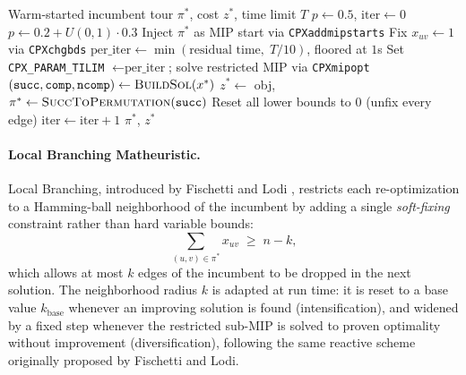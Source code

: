 \documentclass{article}
\begin{document}
\begin{algorithm}[H]
\caption{Hard Fixing Matheuristic (\texttt{TSPopt\_hard\_fixing})}
\label{alg:hardfixing}
\begin{algorithmic}[1]
\Require Warm-started incumbent tour $\pi^*$, cost $z^*$, time limit $T$
\State $p \leftarrow 0.5$, $\text{iter} \leftarrow 0$
        \State $p \leftarrow 0.2 + U(0,1) \cdot 0.3$
    \EndIf
    \State Inject $\pi^*$ as MIP start via \texttt{CPXaddmipstarts}
            \State Fix $x_{uv} \leftarrow 1$ via \texttt{CPXchgbds}
        \EndIf
    \EndFor
    \State $\text{per\_iter} \leftarrow \min(\text{residual time},\; T/10)$, floored at $1$s
    \State Set \texttt{CPX\_PARAM\_TILIM} $\leftarrow \text{per\_iter}$; solve restricted MIP via \texttt{CPXmipopt}
    \State $(\texttt{succ}, \texttt{comp}, \texttt{ncomp}) \leftarrow \textsc{BuildSol}(x^*)$
        \State $z^* \leftarrow$ obj, $\pi^* \leftarrow \textsc{SuccToPermutation}(\texttt{succ})$
    \EndIf
    \State Reset all lower bounds to $0$ (unfix every edge)
    \State $\text{iter} \leftarrow \text{iter} + 1$
\EndWhile
\State \Return $\pi^*$, $z^*$
\end{algorithmic}
\end{algorithm}

\paragraph{Local Branching Matheuristic.}
Local Branching, introduced by Fischetti and Lodi \cite{fischetti2003}, restricts each
re-optimization to a Hamming-ball neighborhood of the incumbent by adding a single
\textit{soft-fixing} constraint rather than hard variable bounds:
\[
\sum_{(u,v) \in \pi^*} x_{uv} \;\geq\; n - k,
\]
which allows at most $k$ edges of the incumbent to be dropped in the next solution. The
neighborhood radius $k$ is adapted at run time: it is reset to a base value $k_{\text{base}}$
whenever an improving solution is found (intensification), and widened by a fixed step whenever
the restricted sub-MIP is solved to proven optimality without improvement (diversification),
following the same reactive scheme originally proposed by Fischetti and Lodi.
\end{document}
